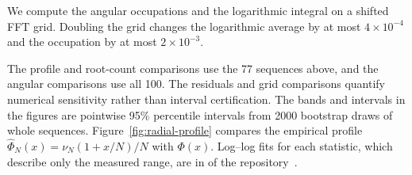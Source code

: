 We compute the angular occupations and the logarithmic integral on a
shifted FFT grid.
Doubling the grid changes the logarithmic average by at most
$4\times10^{-4}$ and the occupation by at most $2\times10^{-3}$.

The profile and root-count comparisons use the 77 sequences above, and
the angular comparisons use all 100.
The residuals and grid comparisons quantify numerical sensitivity rather
than interval certification.
The bands and intervals in the figures are pointwise 95\% percentile
intervals from 2000 bootstrap draws of whole sequences.
Figure~\ref{fig:radial-profile} compares the empirical profile
$\widehat\Phi_N(x)=\nu_N(1+x/N)/N$ with $\Phi(x)$.
Log--log fits for each statistic, which describe only the measured range,
are in  of the
repository~\cite{FormalCompanion2026}.


